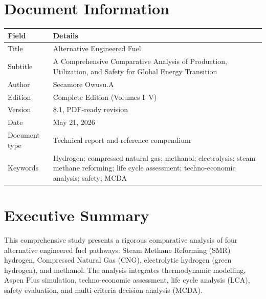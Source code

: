 \documentclass[12pt,twoside,openany]{book}
\let\cleardoublepage\clearpage
\begin{document}
\cleardoublepage
\hypersetup{pageanchor=true}
\frontmatter

\chapter*{Document Information}

\begin{table}[htbp]
    \centering
    \begin{tabular}{L{4cm} L{9cm}}
    \hline
    \textbf{Field} & \textbf{Details} \\
    \hline
    Title & Alternative Engineered Fuel \\
    Subtitle & A Comprehensive Comparative Analysis of Production, Utilization, and Safety for Global Energy Transition \\
    Author & Secamore Owusu.A \\
    Edition & Complete Edition (Volumes I--V) \\
    Version & 8.1, PDF-ready revision \\
    Date & May 21, 2026 \\
    Document type & Technical report and reference compendium \\
    Keywords & Hydrogen; compressed natural gas; methanol; electrolysis; steam methane reforming; life cycle assessment; techno-economic analysis; safety; MCDA \\
    \hline
    \end{tabular}
\end{table}


\chapter*{Executive Summary}

This comprehensive study presents a rigorous comparative analysis of four alternative engineered fuel pathways: Steam Methane Reforming (SMR) hydrogen, Compressed Natural Gas (CNG), electrolytic hydrogen (green hydrogen), and methanol. The analysis integrates thermodynamic modelling, Aspen Plus simulation, techno-economic assessment, life cycle analysis (LCA), safety evaluation, and multi-criteria decision analysis (MCDA).
\end{document}
